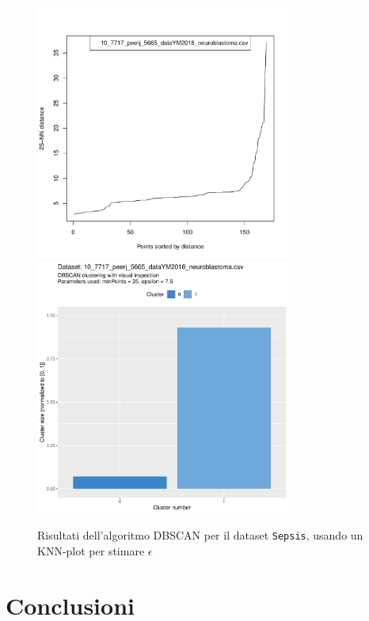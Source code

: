 \documentclass[a4paper, 12pt]{report}
\begin{document}
			\begin{figure}[H]
				\centering
				\includegraphics[width = 0.75\textwidth, height = 0.45\textheight, page = 5]{
					doc/DBSCAN_optimal_MinPts.pdf
				}
				\includegraphics[width = 0.75\textwidth, height = 0.45\textheight, page = 5]{
					results/DBSCAN_visual_comparison.pdf
				}
				\caption{Risultati dell'algoritmo DBSCAN per il dataset
				\texttt{Sepsis}, usando un KNN-plot per stimare $\epsilon$}
				\label{fig:dbscan-extra5}
			\end{figure}

	\chapter{Conclusioni}
\end{document}
